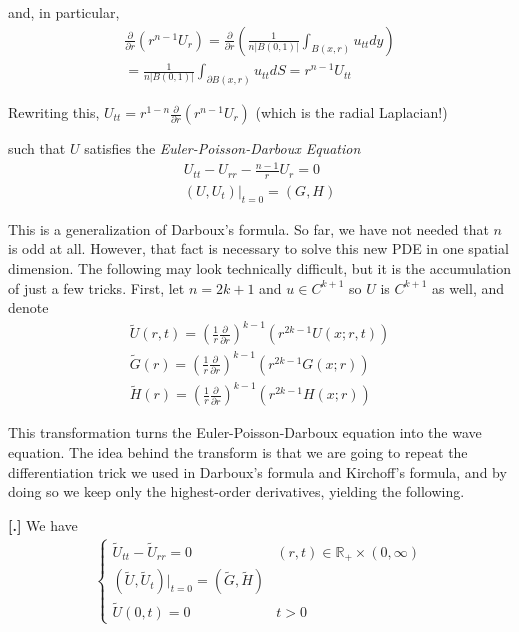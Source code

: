 \documentclass{article}
\newcommand{\R}{{\mathbb{R}}}
\newcommand{\pd}{\partial}
\newcounter{result}[section]
\newenvironment{res}[1][]{\refstepcounter{result}\par\medskip
	\noindent \textbf{[\thesection.\theresult] #1} \rmfamily}{\medskip}
\begin{document}
	and, in particular,
	\begin{align*}
		\frac{\pd}{\pd r}\left(r^{n-1} U_{r}\right) = \frac{\pd}{\pd r} \left(\frac{1}{n|B(0,1)|} \int_{B(x,r)} u_{tt} dy\right) \\
		= \frac{1}{n|B(0,1)|} \int_{\pd B(x,r)} u_{tt} dS = r^{n-1} U_{tt}
	\end{align*}
	
	Rewriting this, $U_{tt} = r^{1-n} \frac{\pd}{\pd r}(r^{n-1} U_{r})$ (which is the radial Laplacian!)
	
	such that $U$ satisfies the \textit{Euler-Poisson-Darboux Equation}
	\begin{align*}
		U_{tt} - U_{rr} - \frac{n-1}{r} U_{r} = 0 \\
		(U,U_t)|_{t=0} = (G,H)
	\end{align*}
	
	This is a generalization of Darboux's formula. So far, we have not needed that $n$ is odd at all. However, that fact is necessary to solve this new PDE in one spatial dimension. The following may look technically difficult, but it is the accumulation of just a few tricks. First, let $n=2k+1$ and $u \in C^{k+1}$ so $U$ is $C^{k+1}$ as well, and denote
	\begin{align*}
		\tilde{U}(r,t) = \left( \frac{1}{r} \frac{\pd}{\pd r}\right)^{k-1}(r^{2k-1}U(x;r,t)) \\
		\tilde{G}(r) = \left( \frac{1}{r} \frac{\pd}{\pd r}\right)^{k-1}(r^{2k-1}G(x;r)) \\
		\tilde{H}(r) = \left( \frac{1}{r} \frac{\pd}{\pd r}\right)^{k-1}(r^{2k-1}H(x;r))
	\end{align*}
	
	This transformation turns the Euler-Poisson-Darboux equation into the wave equation. The idea behind the transform is that we are going to repeat the differentiation trick we used in Darboux's formula and Kirchoff's formula, and by doing so we keep only the highest-order derivatives, yielding the following. 
	
	\begin{res}
		We have
		\begin{align*}
			\begin{cases}
				\tilde{U}_{tt} - \tilde{U}_{rr} = 0 & (r,t) \in \R_+ \times (0,\infty)\\
				(\tilde{U},\tilde{U}_{t})|_{t=0} = (\tilde{G},\tilde{H}) \\
				\tilde{U}(0,t) = 0 & t>0
			\end{cases}
		\end{align*}
	\end{res}
	
\end{document}
